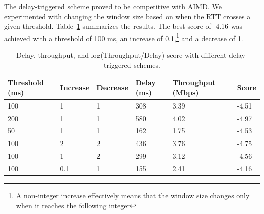 \documentclass[a4paper,10pt]{article}
\begin{document}
The delay-triggered scheme proved to be competitive with AIMD. We experimented with 
changing the window size based on when the RTT crosses a given threshold. 
Table~\ref{tab:delayTriggered} summarizes the results. The best score of -4.16 was achieved with a threshold 
of 100 ms, an increase of 0.1,\footnote{A non-integer increase effectively means 
that the window size changes only when it reaches the following integer} and a 
decrease of 1.

\begin{table}[h]
 \centering
 \begin{tabular}{|l|l|l|l|p{2cm}|l|}
 \hline
   Threshold (ms) & Increase & Decrease & Delay (ms) & Throughput (Mbps) & Score \\
 \hline
  100 & 1 & 1 & 308 & 3.39 & -4.51 \\
  200 & 1 & 1 & 580 & 4.02 & -4.97 \\
  50  & 1 & 1 & 162 & 1.75 & -4.53 \\
  100 & 2 & 2 & 436 & 3.76 & -4.75 \\
  100 & 1 & 2 & 299 & 3.12 & -4.56 \\
  100 & 0.1 & 1 & 155 & 2.41 & -4.16 \\
  \hline
 \end{tabular}
 \caption{Delay, throughput, and log(Throughput/Delay) score with different 
 delay-triggered schemes.}
 \label{tab:delayTriggered}
\end{table}
\end{document}
